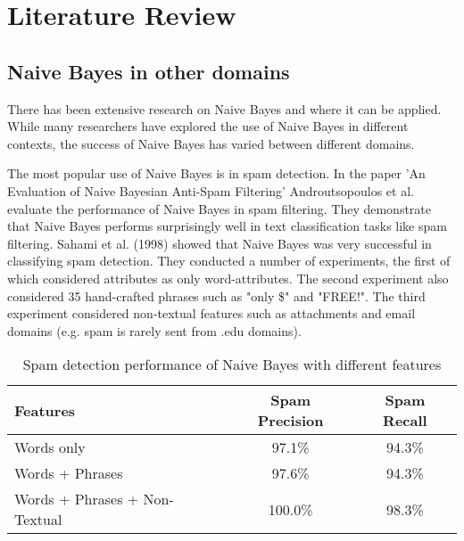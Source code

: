 \chapter{Literature Review}


\section{Naive Bayes in other domains}
There has been extensive research on Naive Bayes and where it can be applied. While many researchers have explored the use of Naive Bayes in different contexts, the success of Naive Bayes has varied between different domains.

The most popular use of Naive Bayes is in spam detection. In the paper 'An Evaluation of Naive Bayesian Anti-Spam Filtering' \cite{androutsopoulosEvaluationNaiveBayesian2000} Androutsopoulos et al. evaluate the performance of Naive Bayes in spam filtering. They demonstrate that Naive Bayes performs surprisingly well in text classification tasks like spam filtering. Sahami et al. (1998) \cite{sahamiBayesianApproachFiltering} showed that Naive Bayes was very successful in classifying spam detection. They conducted a number of experiments, the first of which considered attributes as only word-attributes. The second experiment also considered 35 hand-crafted phrases such as "only \$" and "FREE!". The third experiment considered non-textual features such as attachments and email domains (e.g. spam is rarely sent from .edu domains). 

\begin{table}[h!]
    \centering
    \begin{tabular}{lcc}
    \toprule
    \textbf{Features} & \textbf{Spam Precision} & \textbf{Spam Recall} \\
    \midrule
    Words only & 97.1\% & 94.3\% \\
    Words + Phrases & 97.6\% & 94.3\% \\
    Words + Phrases + Non-Textual & 100.0\% & 98.3\% \\
    \bottomrule
    \end{tabular}
    \caption{Spam detection performance of Naive Bayes with different features}
\end{table}

